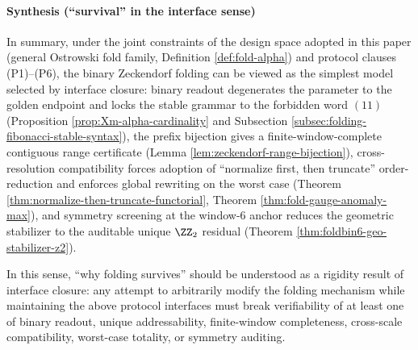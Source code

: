 \paragraph{Synthesis (``survival'' in the interface sense)}
In summary, under the joint constraints of the design space adopted in this paper (general Ostrowski fold family, Definition \ref{def:fold-alpha}) and protocol clauses (P1)--(P6), the binary Zeckendorf folding can be viewed as the simplest model selected by interface closure: binary readout degenerates the parameter to the golden endpoint and locks the stable grammar to the forbidden word \((11)\) (Proposition \ref{prop:Xm-alpha-cardinality} and Subsection \ref{subsec:folding-fibonacci-stable-syntax}), the prefix bijection gives a finite-window-complete contiguous range certificate (Lemma \ref{lem:zeckendorf-range-bijection}), cross-resolution compatibility forces adoption of ``normalize first, then truncate'' order-reduction and enforces global rewriting on the worst case (Theorem \ref{thm:normalize-then-truncate-functorial}, Theorem \ref{thm:fold-gauge-anomaly-max}), and symmetry screening at the window-\(6\) anchor reduces the geometric stabilizer to the auditable unique \(\ZZ_2\) residual (Theorem \ref{thm:foldbin6-geo-stabilizer-z2}).\par
In this sense, ``why folding survives'' should be understood as a rigidity result of interface closure: any attempt to arbitrarily modify the folding mechanism while maintaining the above protocol interfaces must break verifiability of at least one of binary readout, unique addressability, finite-window completeness, cross-scale compatibility, worst-case totality, or symmetry auditing.
